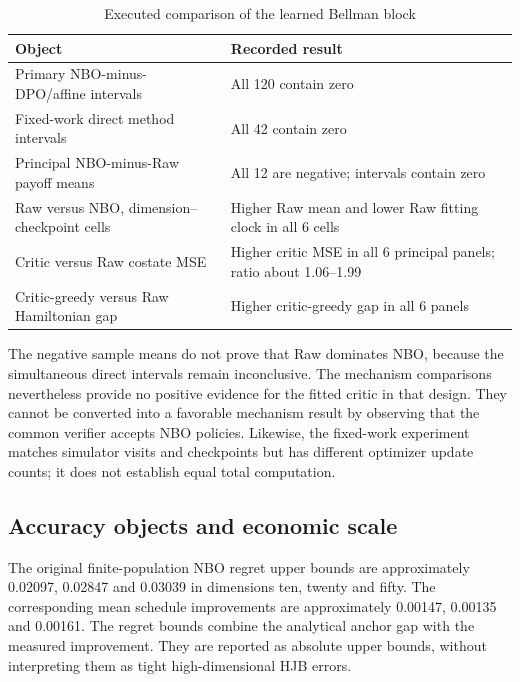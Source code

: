 \begin{table}[!htbp]
\caption{Executed comparison of the learned Bellman block}\label{tab:r15referenceevidence}
\centering\small
\begin{tabular}{p{}p{}}
\toprule
Object & Recorded result\\
\midrule
Primary NBO-minus-DPO/affine intervals & All 120 contain zero\\
Fixed-work direct method intervals & All 42 contain zero\\
Principal NBO-minus-Raw payoff means & All 12 are negative; intervals contain zero\\
Raw versus NBO, dimension--checkpoint cells & Higher Raw mean and lower Raw fitting clock in all 6 cells\\
Critic versus Raw costate MSE & Higher critic MSE in all 6 principal panels; ratio about 1.06--1.99\\
Critic-greedy versus Raw Hamiltonian gap & Higher critic-greedy gap in all 6 panels\\
\bottomrule
\end{tabular}
\end{table}

The negative sample means do not prove that Raw dominates NBO, because the simultaneous direct intervals remain inconclusive. The mechanism comparisons nevertheless provide no positive evidence for the fitted critic in that design. They cannot be converted into a favorable mechanism result by observing that the common verifier accepts NBO policies. Likewise, the fixed-work experiment matches simulator visits and checkpoints but has different optimizer update counts; it does not establish equal total computation.

\subsection{Accuracy objects and economic scale}
The original finite-population NBO regret upper bounds are approximately 0.02097, 0.02847 and 0.03039 in dimensions ten, twenty and fifty. The corresponding mean schedule improvements are approximately 0.00147, 0.00135 and 0.00161. The regret bounds combine the analytical anchor gap with the measured improvement. They are reported as absolute upper bounds, without interpreting them as tight high-dimensional HJB errors.

